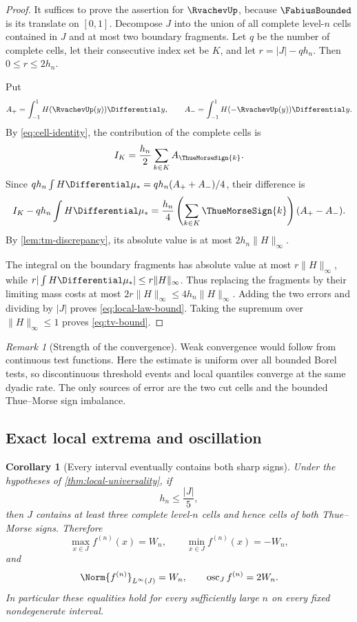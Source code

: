 \documentclass[11pt,a4paper]{article}
\newtheorem{corollary}[theorem]{Corollary}
\theoremstyle{definition}
\theoremstyle{remark}
\newtheorem{remark}[theorem]{Remark}
\newcommand{\osc}{\operatorname{osc}}
\begin{document}
\begin{proof}
It suffices to prove the assertion for $\RvachevUp$, because $\FabiusBounded$ is its translate on
$[0,1]$.  Decompose $J$ into the union of all complete level-$n$ cells contained in
$J$ and at most two boundary fragments.  Let $q$ be the number of complete cells,
let their consecutive index set be $K$, and let $r=|J|-qh_n$.  Then
$0\le r\le2h_n$.

Put
\[
 A_+=\int_{-1}^{1}H(\RvachevUp(y))\Differential y,
 \qquad
 A_-=\int_{-1}^{1}H(-\RvachevUp(y))\Differential y.
\]
By \eqref{eq:cell-identity}, the contribution of the complete cells is
\[
 I_K=\frac{h_n}{2}\sum_{k\in K}A_{\ThueMorseSign{k}}.
\]
Since $q h_n\int H\Differential\mu_*=qh_n(A_++A_-)/4$, their difference is
\[
 I_K-qh_n\int H\Differential\mu_*
 =\frac{h_n}{4}\left(\sum_{k\in K}\ThueMorseSign{k}\right)(A_+-A_-).
\]
By \cref{lem:tm-discrepancy}, its absolute value is at most
$2h_n\|H\|_\infty$.

The integral on the boundary fragments has absolute value at most
$r\|H\|_\infty$, while
$r|\int H\Differential\mu_*|\le r\|H\|_\infty$.  Thus replacing the fragments by their
limiting mass costs at most $2r\|H\|_\infty\le4h_n\|H\|_\infty$.
Adding the two errors and dividing by $|J|$ proves \eqref{eq:local-law-bound}.
Taking the supremum over $\|H\|_\infty\le1$ proves \eqref{eq:tv-bound}.
\end{proof}

\begin{remark}[Strength of the convergence]
Weak convergence would follow from continuous test functions.  Here the estimate is
uniform over all bounded Borel tests, so discontinuous threshold events and local
quantiles converge at the same dyadic rate.  The only sources of error are the two
cut cells and the bounded Thue--Morse sign imbalance.
\end{remark}

\subsection{Exact local extrema and oscillation}

\begin{corollary}[Every interval eventually contains both sharp signs]
\label{cor:local-extrema}
Under the hypotheses of \cref{thm:local-universality}, if
\begin{equation}
  h_n\le\frac{|J|}{5},
  \label{eq:cell-threshold}
\end{equation}
then $J$ contains at least three complete level-$n$ cells and hence cells of both
Thue--Morse signs.  Therefore
\begin{equation}
 \max_{x\in J}f^{(n)}(x)=W_n,
 \qquad
 \min_{x\in J}f^{(n)}(x)=-W_n,
 \label{eq:local-extrema}
\end{equation}
and
\begin{equation}
  \Norm{f^{(n)}}_{L^\infty(J)}=W_n,
  \qquad
  \osc_J f^{(n)}=2W_n.
  \label{eq:local-osc}
\end{equation}
In particular these equalities hold for every sufficiently large $n$ on every fixed
nondegenerate interval.
\end{corollary}
\end{document}
